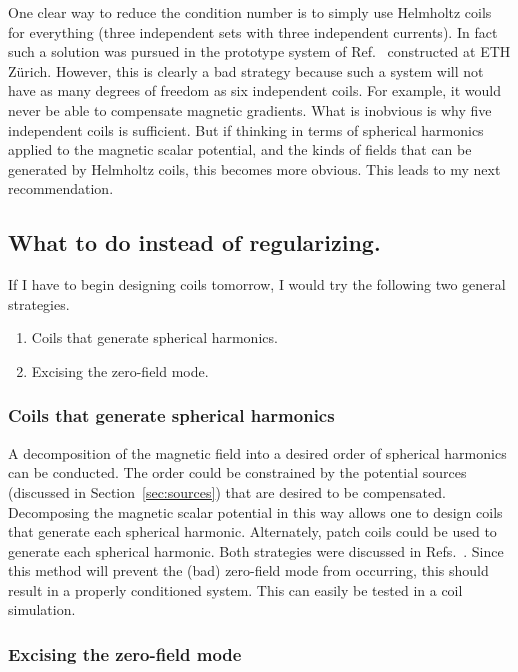 One clear way to reduce the condition number is to simply use Helmholtz coils for everything (three independent sets with three independent currents).  In fact such a solution was pursued in the prototype system of Ref.~\cite{rawlik} constructed at ETH Z\"urich. However, this is clearly a bad strategy because such a system will not have as many degrees of freedom as six independent coils.  For example, it would never be able to compensate magnetic gradients. What is inobvious is why five independent coils is sufficient.  But if thinking in terms of spherical harmonics applied to the magnetic scalar potential, and the kinds of fields that can be generated by Helmholtz coils, this becomes more obvious.  This leads to my next recommendation.


\subsection{What to do instead of regularizing.\label{sec:spherical}}

If I have to begin designing coils tomorrow, I would try the following two general strategies.
\begin{enumerate}
    \item Coils that generate spherical harmonics.
    \item Excising the zero-field mode.
\end{enumerate}

\subsubsection{Coils that generate spherical harmonics}

A decomposition of the magnetic field into a desired order of spherical harmonics can be conducted. The order could be constrained by the potential sources (discussed in Section~\ref{sec:sources}) that are desired to be compensated.  Decomposing the magnetic scalar potential in this way allows one to design coils that generate each spherical harmonic.  Alternately, patch coils could be used to generate each spherical harmonic. Both strategies were discussed in Refs.~\cite{rawlik,rawlik_paper_coil}. Since this method will prevent the (bad) zero-field mode from occurring, this should result in a properly conditioned system.  This can easily be tested in a coil simulation.

\subsubsection{Excising the zero-field mode}

